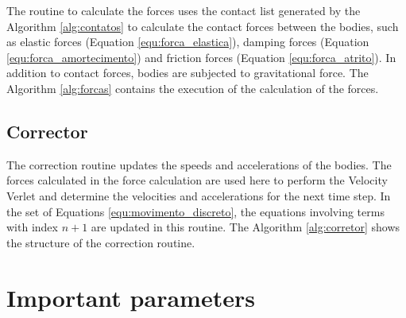     The routine to calculate the forces uses the contact list generated by the Algorithm \ref{alg:contatos} to calculate the contact forces between the bodies, such as elastic forces (Equation \ref{equ:forca_elastica}), damping forces (Equation \ref{equ:forca_amortecimento}) and friction forces (Equation \ref{equ:forca_atrito}). In addition to contact forces, bodies are subjected to gravitational force. The Algorithm \ref{alg:forcas} contains the execution of the calculation of the forces. 



\subsection{Corrector}

    The correction routine updates the speeds and accelerations of the bodies. The forces calculated in the force calculation are used here to perform the Velocity Verlet and determine the velocities and accelerations for the next time step. In the set of Equations \ref{equ:movimento_discreto}, the equations involving terms with index $n+1$ are updated in this routine. The Algorithm \ref{alg:corretor} shows the structure of the correction routine.



\section{Important parameters}


